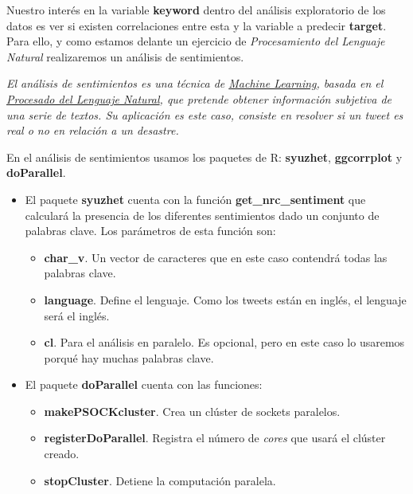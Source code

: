 \documentclass[]{article}
\providecommand{\tightlist}{%
  \setlength{\itemsep}{0pt}\setlength{\parskip}{0pt}}
\begin{document}
Nuestro interés en la variable \textbf{keyword} dentro del análisis
exploratorio de los datos es ver si existen correlaciones entre esta y
la variable a predecir \textbf{target}. Para ello, y como estamos
delante un ejercicio de \emph{Procesamiento del Lenguaje Natural}
realizaremos un análisis de sentimientos.

\emph{El análisis de sentimientos es una técnica de
\href{https://en.wikipedia.org/wiki/Machine_learning}{Machine Learning},
basada en el
\href{https://www.kdnuggets.com/2017/02/natural-language-processing-key-terms-explained.html}{Procesado
del Lenguaje Natural}, que pretende obtener información subjetiva de una
serie de textos. Su aplicación es este caso, consiste en resolver si un
tweet es real o no en relación a un desastre.}

En el análisis de sentimientos usamos los paquetes de R:
\textbf{syuzhet}, \textbf{ggcorrplot} y \textbf{doParallel}.

\begin{itemize}
\tightlist
\item
  El paquete \textbf{syuzhet} cuenta con la función
  \textbf{get\_nrc\_sentiment} que calculará la presencia de los
  diferentes sentimientos dado un conjunto de palabras clave. Los
  parámetros de esta función son:

  \begin{itemize}
  \tightlist
  \item
    \textbf{char\_v}. Un vector de caracteres que en este caso contendrá
    todas las palabras clave.
  \item
    \textbf{language}. Define el lenguaje. Como los tweets están en
    inglés, el lenguaje será el inglés.
  \item
    \textbf{cl}. Para el análisis en paralelo. Es opcional, pero en este
    caso lo usaremos porqué hay muchas palabras clave.
  \end{itemize}
\item
  El paquete \textbf{doParallel} cuenta con las funciones:

  \begin{itemize}
  \tightlist
  \item
    \textbf{makePSOCKcluster}. Crea un clúster de sockets paralelos.
  \item
    \textbf{registerDoParallel}. Registra el número de \emph{cores} que
    usará el clúster creado.
  \item
    \textbf{stopCluster}. Detiene la computación paralela.
  \end{itemize}
\end{itemize}
\end{document}
